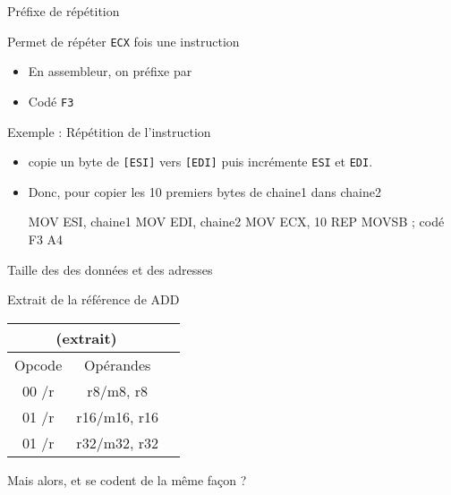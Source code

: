 \documentclass[14pt,xcolor,table]{beamer}
\begin{document}
\begin{frame}[fragile]{Préfixe de répétition}

	Permet de répéter \verb_ECX_ fois une instruction
	\begin{itemize}
	\item En assembleur, on préfixe par 
	\item Codé \verb_F3_
	\end{itemize}
	
	Exemple : Répétition de l'instruction  
	\begin{itemize}
		\item {} copie un byte de \verb_[ESI]_
		vers \verb_[EDI]_ puis incrémente \verb_ESI_ et \verb_EDI_.
		\item Donc, pour copier les 10 premiers bytes de chaine1 dans chaine2
		\begin{Asm}
			MOV ESI, chaine1
			MOV EDI, chaine2
			MOV ECX, 10
			REP MOVSB           ; codé F3 A4
		\end{Asm}
	\end{itemize}
\end{frame}

\begin{frame}[fragile]{Taille des des données et des adresses}

	Extrait de la référence de ADD
	\begin{center}
	\begin{small}
	\begin{tabular}{|c|c|c|}
		\multicolumn{2}{c}{\asm{ADD} (extrait)}\\\hline
			{\cellcolor{gray!25}Opcode} & {\cellcolor{gray!25}Opérandes} \\\hline
		00 /r & r8/m8, r8 \\\hline
		01 /r & r16/m16, r16 \\\hline
		01 /r & r32/m32, r32 \\\hline
	\end{tabular}
	\end{small}
	\end{center}

	Mais alors,  et  se codent de la même façon ?
\end{frame}
\end{document}
